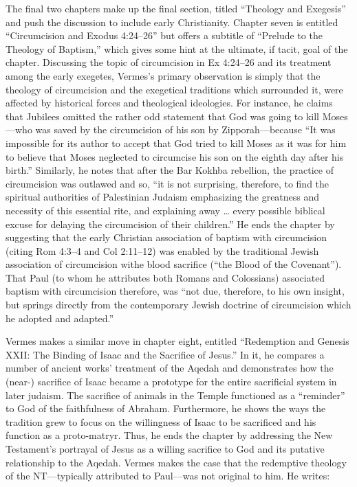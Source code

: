 The final two chapters make up the final section, titled ``Theology and
Exegesis'' and push the discussion to include early Christianity.
Chapter seven is entitled ``Circumcision and Exodus 4:24--26'' but
offers a subtitle of ``Prelude to the Theology of Baptism,'' which gives
some hint at the ultimate, if tacit, goal of the chapter. Discussing the
topic of circumcision in Ex 4:24--26 and its treatment among the early
exegetes, Vermes's primary observation is simply that the theology of
circumcision and the exegetical traditions which surrounded it, were
affected by historical forces and theological ideologies. For instance,
he claims that Jubilees omitted the rather odd statement that God was
going to kill Moses---who was saved by the circumcision of his son by
Zipporah---because ``It was impossible for its author to accept that God
tried to kill Moses as it was for him to believe that Moses neglected to
circumcise his son on the eighth day after his
birth.''\autocite[185]{vermes1961} Similarly, he notes that after the
Bar Kokhba rebellion, the practice of circumcision was outlawed and so,
``it is not surprising, therefore, to find the spiritual authorities of
Palestinian Judaism emphasizing the greatness and necessity of this
essential rite, and explaining away \ldots{} every possible biblical
excuse for delaying the circumcision of their
children.''\autocite[189]{vermes1961} He ends the chapter by suggesting
that the early Christian association of baptism with circumcision
(citing Rom 4:3--4 and Col 2:11--12) was enabled by the traditional
Jewish association of circumcision withe blood sacrifice (``the Blood of
the Covenant'')\autocite[190]{vermes1961}. That Paul (to whom he
attributes both Romans and Colossians) associated baptism with
circumcision therefore, was ``not due, therefore, to his own insight,
but springs directly from the contemporary Jewish doctrine of
circumcision which he adopted and adapted.''\autocite[191]{vermes1961}

Vermes makes a similar move in chapter eight, entitled ``Redemption and
Genesis XXII: The Binding of Isaac and the Sacrifice of Jesus.'' In it,
he compares a number of ancient works' treatment of the Aqedah and
demonstrates how the (near-) sacrifice of Isaac became a prototype for
the entire sacrificial system in later judaism. The sacrifice of animals
in the Temple functioned as a ``reminder'' to God of the faithfulness of
Abraham. Furthermore, he shows the ways the tradition grew to focus on
the willingness of Isaac to be sacrificed and his function as a
proto-matryr. Thus, he ends the chapter by addressing the New
Testament's portrayal of Jesus as a willing sacrifice to God and its
putative relationship to the Aqedah. Vermes makes the case that the
redemptive theology of the NT---typically attributed to Paul---was not
original to him. He writes:

